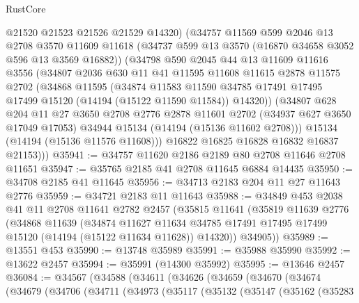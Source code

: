 \begin{lexlean}{RustCore}
\begin{coremodule}
        @21520
        @21523
        @21526
        @21529
        @14320)
      (@34757
        @11569
        @599
        @2046
        @13
        @2708
        @3570
        @11609
        @11618
        (@34737 @599 @13 @3570 (@16870 @34658 @3052 @596 @13 @3569 @16882))
        (@34798
          @590
          @2045
          @44
          @13
          @11609
          @11616
          @3556
          (@34807
            @2036
            @630
            @11
            @41
            @11595
            @11608
            @11615
            @2878
            @11575
            @2702
            (@34868
              @11595
              (@34874
                @11583
                @11590
                @34785
                @17491
                @17495
                @17499
                @15120
                (@14194 (@15122 @11590 @11584))
                @14320))
            (@34807
              @628
              @204
              @11
              @27
              @3650
              @2708
              @2776
              @2878
              @11601
              @2702
              (@34937 @627 @3650 @17049 @17053)
              @34944
              @15134
              (@14194 (@15136 @11602 @2708)))
            @15134
            (@14194 (@15136 @11576 @11608)))
          @16822
          @16825
          @16828
          @16832
          @16837
          @21153)))
@35941 := @34757 @11620 @2186 @2189 @80 @2708 @11646 @2708 @11651
@35947 := @35765 @2185 @41 @2708 @11645 @6884 @14435
@35950 := @34708 @2185 @41 @11645
@35956 := @34713 @2183 @204 @11 @27 @11643 @2776
@35959 := @34721 @2183 @11 @11643
@35988 := @34849
    @453
    @2038
    @41
    @11
    @2708
    @11641
    @2782
    @2457
    (@35815
      @11641
      (@35819
        @11639
        @2776
        (@34868
          @11639
          (@34874
            @11627
            @11634
            @34785
            @17491
            @17495
            @17499
            @15120
            (@14194 (@15122 @11634 @11628))
            @14320))
        @34905))
@35989 := @13551 @453
@35990 := @13748 @35989
@35991 := @35988 @35990
@35992 := @13622 @2457
@35994 := @35991 (@14300 @35992)
@35995 := @13646 @2457
@36084 := @34567
    (@34588
      (@34611
        (@34626
          (@34659
            (@34670
              (@34674
                (@34679
                  (@34706
                    (@34711
                      (@34973
                        (@35117
                          (@35132
                            (@35147
                              (@35162
                                (@35283

\end{coremodule}
\end{lexlean}
